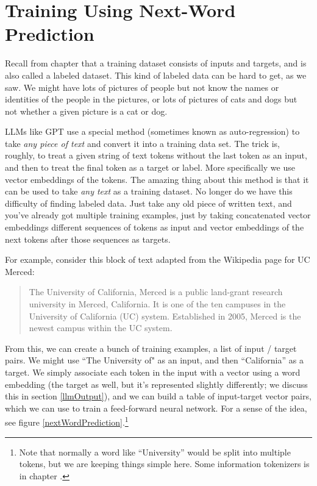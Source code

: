 \section{Training Using Next-Word Prediction}

Recall from chapter  that a training dataset consists of inputs and targets, and is also called a labeled dataset. This kind of labeled data can be hard to get, as we saw.  We might have lots of pictures of people but not know the names or identities of the people in the pictures, or lots of pictures of cats and dogs but not whether a given picture is a cat or dog. 

LLMs like GPT use a special method (sometimes known as auto-regression) to take \emph{any piece of text} and convert it into a training data set. The trick is, roughly, to treat a given string of text tokens without the last token as an input, and then to treat the final token as a target or label. More specifically we use vector embeddings of the tokens. The amazing thing about this method is that it can be used to take \emph{any text} as a training dataset. No longer do we have this difficulty of finding labeled data. Just take any old piece of written text, and you've already got multiple training examples, just by taking concatenated vector embeddings different sequences of tokens as input and vector embeddings of the next tokens after those sequences as targets.

For example, consider this block of text adapted from the Wikipedia page for UC Merced:

\begin{quote}
The University of California, Merced is a public land-grant research university in Merced, California. It is one of the ten campuses in the University of California (UC) system. Established in 2005, Merced is the newest campus within the UC system.
\end{quote}

From this, we can create a bunch of training examples, a list of input / target pairs. We might use ``The University of" as an input, and then ``California'' as a target.  We simply associate each token in the input with a vector using a word embedding (the target as well, but it's represented slightly differently; we discuss this in section \ref{llmOutput}), and we can build a table of input-target vector pairs, which we can use to train a feed-forward neural network.  For a sense of the idea, see figure \ref{nextWordPrediction}.\footnote{Note that normally a word like ``University'' would be split into multiple tokens, but we are keeping things simple here. Some information tokenizers is in chapter .} 

